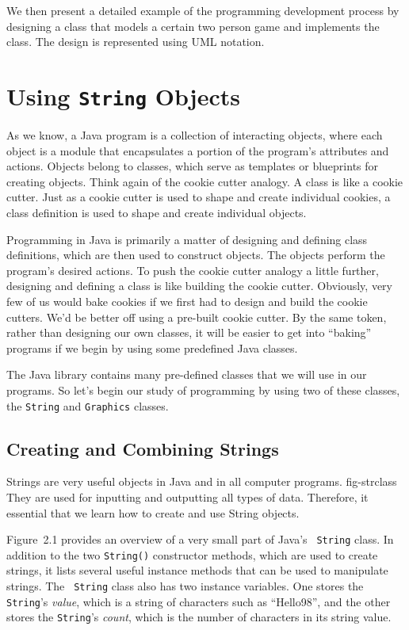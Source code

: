 We then present a detailed example of the programming development
process by designing a class that models a certain two person game
and implements the class.
The design is represented using UML notation.

\section{Using {\tt String} Objects}
\label{using-objects}

\noindent As we know, a Java program is a collection of interacting
objects, where each object is a module that encapsulates a portion of
the program's attributes and actions. Objects belong to classes, which
serve as templates or blueprints for creating objects. Think again of
the cookie cutter analogy. A class is like a cookie cutter. Just as a
cookie cutter is used to shape and create individual cookies, a class
definition is used to shape and create individual objects.

Programming in Java is primarily a matter of designing and defining
class definitions, which are then used to construct objects. The
objects perform the program's desired actions. To push the cookie
cutter analogy a little further, designing and defining a class is
like building the cookie cutter.  Obviously, very few of us would bake
cookies if we first had to design and build the cookie cutters. We'd
be better off using a pre-built cookie cutter. By the same token,
rather than designing our own classes, it will be easier to get into
``baking'' programs if we begin by using some predefined Java classes.

The Java library contains many pre-defined classes that we will use in
our programs. So let's begin our study of programming by using two of
these classes, the {\tt String} and {\tt Graphics} classes.

\subsection{Creating and Combining Strings}

Strings are very useful objects in Java and in all computer programs.
{fig-strclass}
They are used for inputting and outputting all types of
data. Therefore, it essential that we learn how to create and use
String objects.

Figure~2.1 provides an overview of a very small part of Java's {\tt
String} class. In addition to the two {\tt String()} constructor
methods, which are used to create strings, it lists several useful
instance methods that can be used to manipulate strings. The {\tt
String} class also has two instance variables. One stores the {\tt
String}'s {\it value}, which is a string of characters such as
``Hello98'', and the other stores the {\tt String}'s {\it count},
which is the number of characters in its string value.

